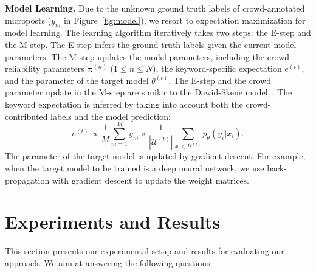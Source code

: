 \documentclass[letterpaper]{article}
\begin{document}
\smallskip
\noindent\textbf{Model Learning.} Due to the unknown ground truth labels of crowd-annotated microposts ($y_m$ in Figure~\ref{fig:model}), we resort to expectation maximization for model learning. The learning algorithm iteratively takes two steps: the E-step and the M-step. The E-step infers the ground truth labels given the current model parameters. The M-step updates the model parameters, including the crowd reliability parameters $\boldsymbol{\pi}^{(n)}$ ($1\leq n\leq N$), the keyword-specific expectation $e^{(t)}$, and the parameter of the target model $\theta^{(t)}$. The E-step and the crowd parameter update in the M-step are similar to the Dawid-Skene model~\cite{dawid1979maximum}. The keyword expectation is inferred by taking into account both the crowd-contributed labels and the model prediction: 
\begin{equation}
    e^{(t)} \propto  \frac{1}{M}\sum_{m=1}^M y_m \times \frac{1}{|\mathcal{U}^{(t)}|} \sum_{x_i\in \mathcal{U}^{(t)}} p_\theta(y_i|x_i).%
\end{equation}
The parameter of the target model is updated by gradient descent. For example, when the target model to be trained is a deep neural network, we use back-propagation with gradient descent to update the weight matrices.


\section{Experiments and Results}
\label{sec:results}
This section presents our experimental setup and results for evaluating our approach. We aim at answering the following questions:
\end{document}
